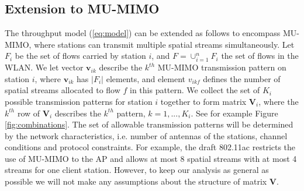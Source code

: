\documentclass[11pt]{amsart}
\def\m#1{\mathbf{#1}}
\begin{document}
\subsection{Extension to MU-MIMO}
\label{sec:muextension}

The throughput model (\ref{eq:model}) can be extended as follows to encompass MU-MIMO, where stations can transmit multiple spatial streams simultaneously. Let $F_i$ be the set of flows carried by station $i$, and $F = \cup_{i=1}^n F_i$  the set of flows in the WLAN.  We let vector $\m{v}_{ik}$ describe the $k^{th}$ MU-MIMO transmission pattern on station $i$, where $\m{v}_{ik}$ has $|F_i|$ elements, and element $v_{ikf}$ defines the number of spatial streams allocated to flow $f$ in this pattern. We collect the set of $K_i$ possible transmission patterns for station $i$ together to form matrix $\m{V}_i$, where the $k^{th}$ row of $\m{V}_i$ describes the $k^{th}$ pattern, $k=1,...,K_i$. See for example Figure \ref{fig:combinations}.     The set of allowable transmission patterns will be determined by the network characteristics, i.e. number of antennas of the stations,  channel conditions and protocol constraints.  For example, the draft 802.11ac restricts the use of MU-MIMO to the AP and allows at most 8 spatial streams with at most 4 streams for one client station. However, to keep our analysis as general as possible we will not make any assumptions about the structure of matrix $\m{V}$.
\end{document}
